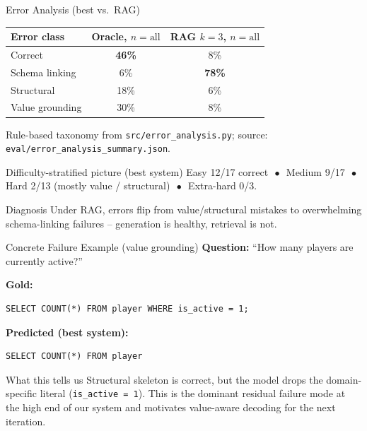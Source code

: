 \documentclass[aspectratio=169,11pt]{beamer}
\begin{document}
\begin{frame}{Error Analysis (best vs.\ RAG)}
  \centering\small
  \begin{tabular}{lcc}
    \toprule
    \textbf{Error class} & \textbf{Oracle, $n{=}\text{all}$} & \textbf{RAG $k{=}3$, $n{=}\text{all}$} \\
    \midrule
    Correct          & \textbf{46\%} & 8\% \\
    Schema linking   & 6\%           & \alert{\textbf{78\%}} \\
    Structural       & 18\%          & 6\% \\
    Value grounding  & 30\%          & 8\% \\
    \bottomrule
  \end{tabular}

  \vspace{4pt}
  {\footnotesize Rule-based taxonomy from \texttt{src/error\_analysis.py};
  source: \texttt{eval/error\_analysis\_summary.json}.}

  \begin{block}{Difficulty-stratified picture (best system)}
    Easy 12/17 correct \,\,$\bullet$\,\, Medium 9/17 \,\,$\bullet$\,\,
    Hard 2/13 (mostly value / structural) \,\,$\bullet$\,\, Extra-hard 0/3.
  \end{block}

  \begin{alertblock}{Diagnosis}
    Under RAG, errors flip from value/structural mistakes to overwhelming
    schema-linking failures -- generation is healthy, retrieval is not.
  \end{alertblock}
\end{frame}

\begin{frame}[fragile]{Concrete Failure Example (value grounding)}
  \textbf{Question:} ``How many players are currently active?''

  \vspace{4pt}
  \textbf{Gold:}
\begin{lstlisting}
SELECT COUNT(*) FROM player WHERE is_active = 1;
\end{lstlisting}

  \textbf{Predicted (best system):}
\begin{lstlisting}
SELECT COUNT(*) FROM player
\end{lstlisting}

  \begin{block}{What this tells us}
    Structural skeleton is correct, but the model drops the
    domain-specific literal (\texttt{is\_active = 1}). This is the
    dominant residual failure mode at the high end of our system and
    motivates value-aware decoding for the next iteration.
  \end{block}
\end{frame}
\end{document}
